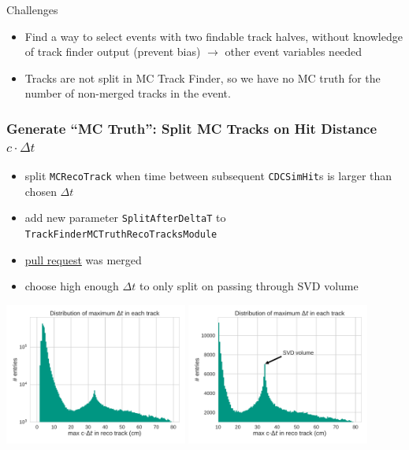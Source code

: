\documentclass[18pt]{beamer}
\begin{document}
  \begin{frame}
    \begin{alertblock}{Challenges}
      \begin{itemize}
      \item Find a way to select events with two findable track halves, without knowledge of track finder output (prevent bias) $\rightarrow$ other event variables needed
      \item Tracks are not split in MC Track Finder, so we have no MC truth for the number of non-merged tracks in the event.
      \end{itemize}
      
    \end{alertblock}
  \end{frame}


\begin{frame}
  \frametitle{Generate ``MC Truth'': Split MC Tracks on Hit Distance $c \cdot \Delta t$}
  \begin{itemize}
  \item split \texttt{MCRecoTrack} when time between subsequent \texttt{CDCSimHit}s is larger than chosen $\Delta t$
  \item add new parameter \texttt{SplitAfterDeltaT} to \texttt{TrackFinderMCTruthRecoTracksModule}
  \item \href{https://stash.desy.de/projects/B2/repos/software/pull-requests/737}{pull request} was merged
  \item choose high enough $\Delta t$ to only split on passing through SVD volume
  \end{itemize}
  \begin{center}
    \includegraphics[width=0.45\textwidth]{figures/delta_t/delta_t_max_log.pdf}
    \includegraphics[width=0.45\textwidth]{figures/delta_t/delta_t_max_linear_annotated.pdf}
  \end{center}
\end{frame}
\end{document}

